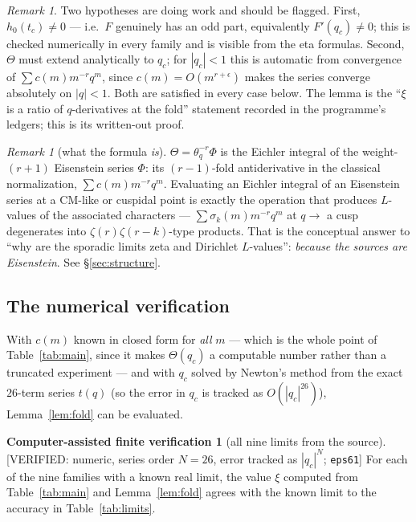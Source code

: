 \documentclass[11pt,reqno]{amsart}
\theoremstyle{plain}
\theoremstyle{definition}
\newtheorem{verification}[theorem]{Computer-assisted finite verification}
\theoremstyle{remark}
\newtheorem{remark}[theorem]{Remark}
\newcommand{\thq}{\theta_q}
\newcommand{\VerifiedR}[1]{\textup{\textsf{[VERIFIED: #1]}}}
\begin{document}
\begin{remark}
Two hypotheses are doing work and should be flagged. First, $h_0(t_c)\neq0$
--- i.e.\ $F$ genuinely has an odd part, equivalently $F'(q_c)\neq0$; this
is checked numerically in every family and is visible from the eta
formulas. Second, $\Theta$ must extend analytically to $q_c$; for
$|q_c|<1$ this is automatic from convergence of $\sum c(m)m^{-r}q^m$, since
$c(m)=O(m^{r+\epsilon})$ makes the series converge absolutely on $|q|<1$.
Both are satisfied in every case below. The lemma is the ``$\xi$ is a ratio
of $q$-derivatives at the fold'' statement recorded in the programme's
ledgers; this is its written-out proof.
\end{remark}

\begin{remark}[what the formula \emph{is}]
$\Theta=\thq^{-r}\Phi$ is the Eichler integral of the weight-$(r+1)$
Eisenstein series $\Phi$: its $(r-1)$-fold antiderivative in the classical
normalization, $\sum c(m)m^{-r}q^m$. Evaluating an Eichler integral of an
Eisenstein series at a CM-like or cuspidal point is exactly the operation
that produces $L$-values of the associated characters --- $\sum
\sigma_{k}(m)m^{-r}q^m$ at $q\to$ a cusp degenerates into
$\zeta(r)\zeta(r-k)$-type products. That is the conceptual answer to ``why
are the sporadic limits zeta and Dirichlet $L$-values'': \emph{because the
sources are Eisenstein}. See \S\ref{sec:structure}.
\end{remark}

\subsection{The numerical verification}
With $c(m)$ known in closed form for \emph{all} $m$ --- which is the whole
point of Table~\ref{tab:main}, since it makes $\Theta(q_c)$ a computable
number rather than a truncated experiment --- and with $q_c$ solved by
Newton's method from the exact $26$-term series $t(q)$ (so the error in
$q_c$ is tracked as $O(|q_c|^{26})$), Lemma~\ref{lem:fold} can be evaluated.

\begin{verification}[all nine limits from the source]\label{ver:limits}
\VerifiedR{numeric, series order $N=26$, error tracked as $|q_c|^{N}$;
\texttt{eps61}}
For each of the nine families with a known real limit, the value $\xi$
computed from Table~\ref{tab:main} and Lemma~\ref{lem:fold} agrees with the
known limit to the accuracy in Table~\ref{tab:limits}.
\end{verification}
\end{document}
